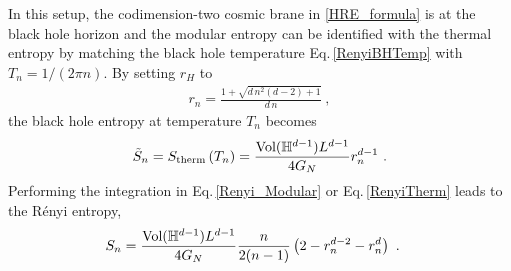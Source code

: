 In this setup, the codimension-two cosmic brane in \eqref{HRE_formula} is at the black hole horizon and the modular entropy can be identified with the thermal entropy by matching the black hole temperature Eq.\,\eqref{RenyiBHTemp} with $T_n = 1/(2\pi n)$.
By setting $r_H$ to
\begin{align}
	r_n = \frac{1+\sqrt{d\,n^2(d - 2) + 1}}{d\, n} \ ,
\end{align}
the black hole entropy at temperature $T_n$ becomes 
\begin{align}
	\tilde S_n = S_\text{therm}\left(T_n\right) = \frac{\text{Vol}(\mathbb{H}^{d-1})L^{d-1}}{4G_N} r_n^{d-1} \ .
\end{align}
Performing the integration in Eq.\,\eqref{Renyi_Modular} or Eq.\,\eqref{RenyiTherm} leads to the R{\'e}nyi entropy,
\begin{align}
\begin{aligned}
	S_n 	&= \frac{\text{Vol}(\mathbb{H}^{d-1})L^{d-1}}{4G_N}\frac{n}{2(n-1)}\left(2 - r_n^{d-2} - r_n^d\right) \ .
\end{aligned}
\end{align}



\endinput